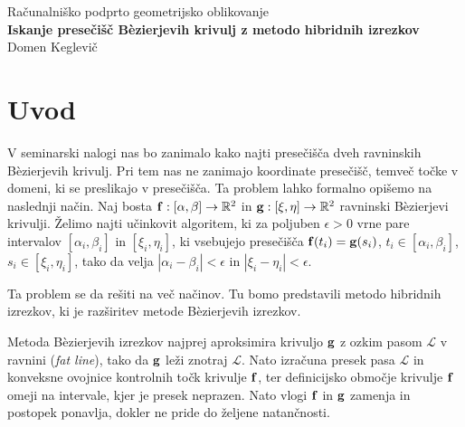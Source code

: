 \documentclass[12pt,a4paper, reqno]{amsart}
\def\R{\mathbb R}
\begin{document}
\thispagestyle{empty}
\medskip
\begin{center}{\large
Računalniško podprto geometrijsko oblikovanje\\[4mm]
{\bf Iskanje presečišč B\`{e}zierjevih krivulj z metodo hibridnih izrezkov}\\[4mm]
Domen Keglevič\\[6mm]
}
\end{center}
\medskip
\section{Uvod}
V seminarski nalogi nas bo zanimalo kako najti presečišča dveh ravninskih B\`{e}zier\-jevih krivulj. Pri tem nas ne zanimajo koordinate presečišč, temveč točke v domeni, ki se preslikajo v presečišča. Ta problem lahko formalno opišemo na naslednji način. Naj bosta ${\bf f}:[\alpha,\beta]\rightarrow \R^2$ in ${\bf g}:[\xi,\eta]\rightarrow \R^2$ ravninski B\`{e}zierjevi krivulji. Želimo najti učinkovit algoritem, ki za poljuben $\epsilon >0$ vrne pare intervalov $[\alpha_i,\beta_i]$ in $[\xi_i,\eta_i]$, ki vsebujejo presečišča ${\bf f}(t_i) = {\bf g}(s_i)$, $t_i\in[\alpha_i,\beta_i]$, $s_i\in[\xi_i,\eta_i]$, tako da velja $|\alpha _i - \beta _i| < \epsilon$ in $|\xi _i - \eta _i| < \epsilon$.

Ta problem se da rešiti na več načinov. Tu bomo predstavili metodo hibridnih izrezkov, ki je razširitev metode B\`{e}zierjevih izrezkov. 

Metoda B\`{e}zierjevih izrezkov najprej aproksimira krivuljo ${\bf g}$ z ozkim pasom $\mathcal{L}$ v ravnini ({\em fat line}), tako da ${\bf g}$ leži znotraj $\mathcal{L}$. Nato izračuna presek pasa $\mathcal{L}$ in konveksne ovojnice kontrolnih točk krivulje ${\bf f}$, ter definicijsko območje krivulje ${\bf f}$ omeji na intervale, kjer je presek neprazen. 
Nato vlogi ${\bf f}$ in ${\bf g}$ zamenja in postopek ponavlja, dokler ne pride do željene natančnosti.
\end{document}
